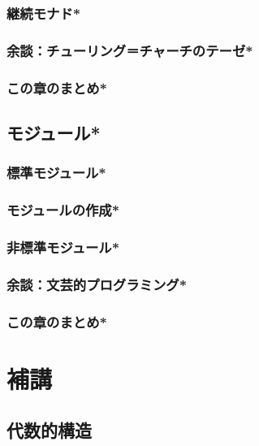 \documentclass[a5paper,twoside,fleqn,draft]{jsbook}
\begin{document}
\section{継続モナド*}
\section{余談：チューリング＝チャーチのテーゼ*}
\section{この章のまとめ*}

\chapter{モジュール*}
\section{標準モジュール*}
\section{モジュールの作成*}
\section{非標準モジュール*}
\section{余談：文芸的プログラミング*}
\section{この章のまとめ*}

\part{補講}

\chapter{代数的構造}
\end{document}

